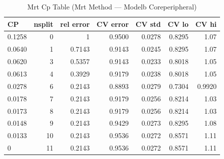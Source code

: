 \begin{table}[htbp]
  \centering
  \caption{Mrt Cp Table (Mrt Method — Modelb Coreperipheral)}
  \label{tab:MRT_Method_ModelB_CorePeripheral_tables_mrt_cp_table}
  \small
  \begin{tabular}{lrrrrrr}
    \toprule
    CP & nsplit & rel error & CV error & CV std & CV lo & CV hi \\
    \midrule
    0.1258 & 0 & 1 & 0.9500 & 0.0278 & 0.8295 & 1.07 \\
    0.0640 & 1 & 0.7143 & 0.9143 & 0.0245 & 0.8295 & 1.07 \\
    0.0620 & 3 & 0.5357 & 0.9143 & 0.0233 & 0.8018 & 1.05 \\
    0.0613 & 4 & 0.3929 & 0.9179 & 0.0238 & 0.8018 & 1.05 \\
    0.0278 & 6 & 0.2143 & 0.8893 & 0.0279 & 0.7304 & 0.9920 \\
    0.0178 & 7 & 0.2143 & 0.9179 & 0.0256 & 0.8214 & 1.03 \\
    0.0173 & 8 & 0.2143 & 0.9179 & 0.0256 & 0.8214 & 1.03 \\
    0.0148 & 9 & 0.2143 & 0.9429 & 0.0273 & 0.8295 & 1.08 \\
    0.0133 & 10 & 0.2143 & 0.9536 & 0.0272 & 0.8571 & 1.11 \\
    0 & 11 & 0.2143 & 0.9536 & 0.0272 & 0.8571 & 1.11 \\
    \bottomrule
  \end{tabular}
\end{table}
